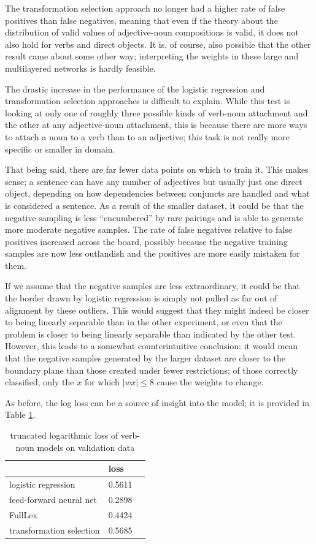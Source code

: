 \documentclass[a4paper, 12pt]{article}
\begin{document}
The transformation selection approach no longer had a higher rate of false positives than false negatives, meaning that even if the theory about the distribution of valid values of adjective-noun compositions is valid, it does not also hold for verbs and direct objects. It is, of course, also possible that the other result came about some other way; interpreting the weights in these large and multilayered networks is hardly feasible.

The drastic increase in the performance of the logistic regression and transformation selection approaches is difficult to explain. While this test is looking at only one of roughly three possible kinds of verb-noun attachment and the other at any adjective-noun attachment, this is because there are more ways to attach a noun to a verb than to an adjective; this task is not really more specific or smaller in domain.

That being said, there are far fewer data points on which to train it. This makes sense; a sentence can have any number of adjectives but usually just one direct object, depending on how dependencies between conjuncts are handled and what is considered a sentence. As a result of the smaller dataset, it could be that the negative sampling is less ``encumbered'' by rare pairings and is able to generate more moderate negative samples. The rate of false negatives relative to false positives increased across the board, possibly because the negative training samples are now less outlandish and the positives are more easily mistaken for them.

If we assume that the negative samples are less extraordinary, it could be that the border drawn by logistic regression is simply not pulled as far out of alignment by these outliers. This would suggest that they might indeed be closer to being linearly separable than in the other experiment, or even that the problem is closer to being linearly separable than indicated by the other test. However, this leads to a somewhat counterintuitive conclusion: it would mean that the negative samples generated by the larger dataset are closer to the boundary plane than those created under fewer restrictions; of those correctly classified, only the $ x $ for which $ | wx | \leq 8 $ cause the weights to change.

As before, the log loss can be a source of insight into the model; it is provided in Table \ref{loss-vn}.

\begin{table}[]
	\centering
	\begin{tabular}{l|l|l}
		                         & loss      \\ \hline
		logistic regression      & 0.5611    \\
		feed-forward neural net  & 0.2898    \\
		FullLex                  & 0.4424    \\
		transformation selection & 0.5685
	\end{tabular}
	\caption{truncated logarithmic loss of verb-noun models on validation data}
	\label{loss-vn}
\end{table}
\end{document}
